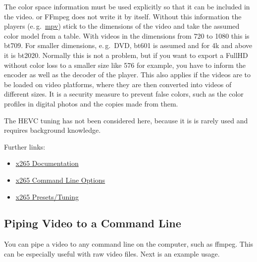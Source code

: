 The color space information must be used explicitly so that it can
be included in the video. \CGG{} or FFmpeg does not write it by
itself. Without this information the players (e.\,g.\
\href{https://mpv.io/}{mpv}) stick to the dimensions of the video
and take the assumed color model from a table. With videos in the
dimensions from 720 to 1080 this is bt709. For smaller dimensions,
e.\,g.\ DVD, bt601 is assumed and for 4k and above it is
bt2020. Normally this is not a problem, but if you want to export a
FullHD without color loss to a smaller size like 576 for example,
you have to inform the encoder as well as the decoder of the
player. This also applies if the videos are to be loaded on video
platforms, where they are then converted into videos of different
sizes. It is a security measure to prevent false colors, such as the
color profiles in digital photos and the copies made from them.

The HEVC tuning has not been considered here, because it is is
rarely used and requires background knowledge.

Further links:
\begin{itemize}
\item \href{http://x265.readthedocs.org/en/default/}{x265
    Documentation}
\item \href{http://x265.readthedocs.org/en/latest/cli.html}{x265
    Command Line Options}
\item \href{http://x265.readthedocs.org/en/latest/presets.html}{x265
    Presets/Tuning}
\end{itemize}

\subsection{Piping Video to a Command Line}%
\label{sub:piping_video_command_line}

You can pipe a video to any command line on the computer, such as
ffmpeg.  This can be especially useful with raw video files.  Next
is an example usage.

